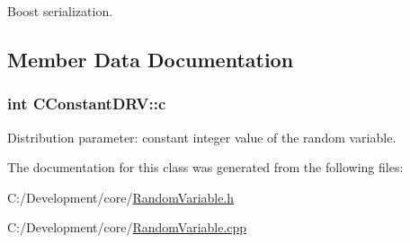 Boost serialization. 



\subsection{Member Data Documentation}
\hypertarget{class_c_constant_d_r_v_a5cabcca79ea5f4c87e8f6c9b0a4e1412}{
\subsubsection[{c}]{\setlength{\rightskip}{0pt plus 5cm}int C\-Constant\-D\-R\-V\-::c\hspace{0.3cm}{\ttfamily [private]}}}\label{class_c_constant_d_r_v_a5cabcca79ea5f4c87e8f6c9b0a4e1412}
Distribution parameter\-: constant integer value of the random variable. 

The documentation for this class was generated from the following files\-:\begin{DoxyCompactItemize}
\item 
C\-:/\-Development/core/\hyperlink{_random_variable_8h}{Random\-Variable.\-h}\item 
C\-:/\-Development/core/\hyperlink{_random_variable_8cpp}{Random\-Variable.\-cpp}\end{DoxyCompactItemize}
